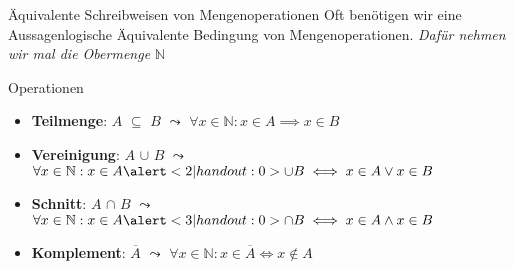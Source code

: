 \begin{frame}[fragile]{Äquivalente Schreibweisen von Mengenoperationen}
    Oft benötigen wir eine Aussagenlogische Äquivalente Bedingung von Mengenoperationen. \emph{Dafür nehmen wir mal die Obermenge $\mathbb{N}$}
    \begin{block}{Operationen}
        \begin{itemize}
            \item<1-> \textbf{Teilmenge}: $A$ \alert<1|handout:0>{$\subseteq$} $B$ $\leadsto$ $\forall x \in \mathbb{N} : x \in A \implies x \in B$\\
            \item<2-> \textbf{Vereinigung}: $A$ \alert<2|handout:0>{$\cup$} $B$ $\leadsto$ $\forall x \in \mathbb{N} : x \in A \alert<2|handout:0>{\cup} B \iff x \in A \vee x \in B$\\
            \item<3-> \textbf{Schnitt}: $A$ \alert<3|handout:0>{$\cap$} $B$ $\leadsto$ $\forall x \in \mathbb{N} : x \in A \alert<3|handout:0>{\cap} B \iff x \in A \wedge x \in B$\\
            \item<4-> \textbf{Komplement}: \alert<4|handout:0>{$\overline{A}$} $\leadsto$ $\forall x \in \mathbb{N} : x \in \overline{A} \iff x \notin A$
        \end{itemize}
    \end{block}

\end{frame}
